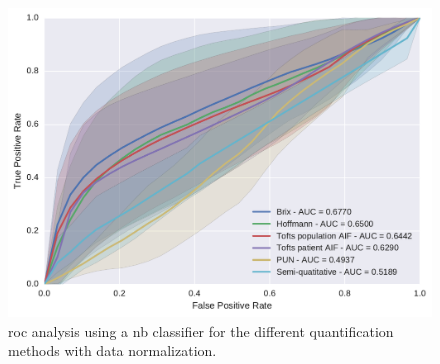 \begin{figure}
  \centering
  \includegraphics[width=0.7\linewidth]{03_experiments/figures/normalized/nb.pdf}
  \caption{\acs*{roc} analysis using a \acs*{nb} classifier for the different quantification methods with data normalization.}
  \label{fig:rfunorm}
\end{figure}

